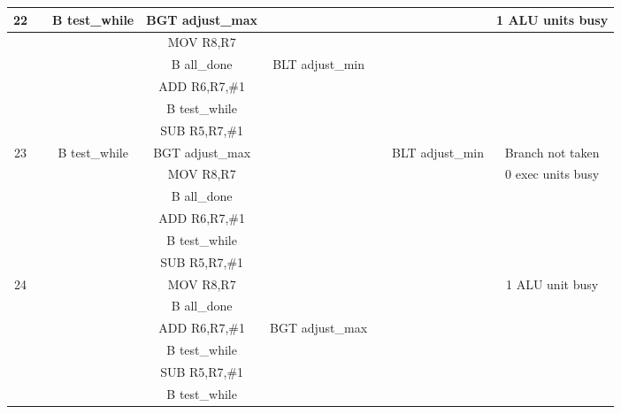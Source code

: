 \documentclass{article}
\begin{document}
{\begin{landscape}
\begin{longtable}{|c|c|c|c|c:c|c|c|}
    22 & & B test\_while & BGT adjust\_max & & & & 1 ALU units busy \\ \hline
     & & & MOV R8,R7 & & & & \\ \hline
     & & &  B all\_done & BLT adjust\_min &  & & \\ \hline
     &  &  & ADD R6,R7,\#1 & &  & & \\ \hline
     &  &  & B test\_while &  &  &  & \\ \hline
     &  &  & SUB R5,R7,\#1 &  &  &  & \\ \hline \hline

    23 & & B test\_while & BGT adjust\_max & & & BLT adjust\_min & Branch not taken \\ \hline
     & & & MOV R8,R7 & & & & 0 exec units busy \\ \hline
     & & &  B all\_done & &  & & \\ \hline
     &  &  & ADD R6,R7,\#1 & &  & & \\ \hline
     &  &  & B test\_while &  &  &  & \\ \hline
     &  &  & SUB R5,R7,\#1 &  &  &  & \\ \hline \hline

    24 & & & MOV R8,R7 & & & & 1 ALU unit busy \\ \hline
     & & & B all\_done & & & & \\ \hline
     & & & ADD R6,R7,\#1 & BGT adjust\_max &  & & \\ \hline
     &  &  & B test\_while & &  & & \\ \hline
     &  &  & SUB R5,R7,\#1 &  &  &  & \\ \hline
     &  &  & B test\_while &  &  &  & \\ \hline \hline


\end{longtable}
\end{landscape}}
\end{document}
